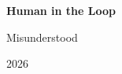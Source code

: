 \begin{center}
	\vspace*{2cm}
	
	{\Huge\bfseries\color{hitlblue} Human in the Loop}
	
	\vspace{0.5cm}
	
	{\LARGE Misunderstood}
	
	\vspace{2cm}
	
	{\Large \bookauthor}
	
	
	{\small 2026}
\end{center}

